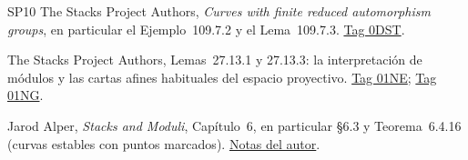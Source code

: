 \documentclass[12pt,openany]{memoir}
\begin{document}
\begin{thebibliography}{SP10}
The Stacks Project Authors, \emph{Curves with finite reduced automorphism
groups}, en particular el Ejemplo~109.7.2 y el Lema~109.7.3.
\href{https://stacks.math.columbia.edu/tag/0DST}{Tag 0DST}.

The Stacks Project Authors, Lemas~27.13.1 y 27.13.3: la interpretación de
módulos y las cartas afines habituales del espacio proyectivo.
\href{https://stacks.math.columbia.edu/tag/01NE}{Tag 01NE};
\href{https://stacks.math.columbia.edu/tag/01NG}{Tag 01NG}.

Jarod Alper, \emph{Stacks and Moduli}, Capítulo~6, en particular \S6.3 y
Teorema~6.4.16 (curvas estables con puntos marcados).
\href{https://sites.math.washington.edu/~jarod/moduli.pdf}{Notas del autor}.
\end{thebibliography}
\end{document}
